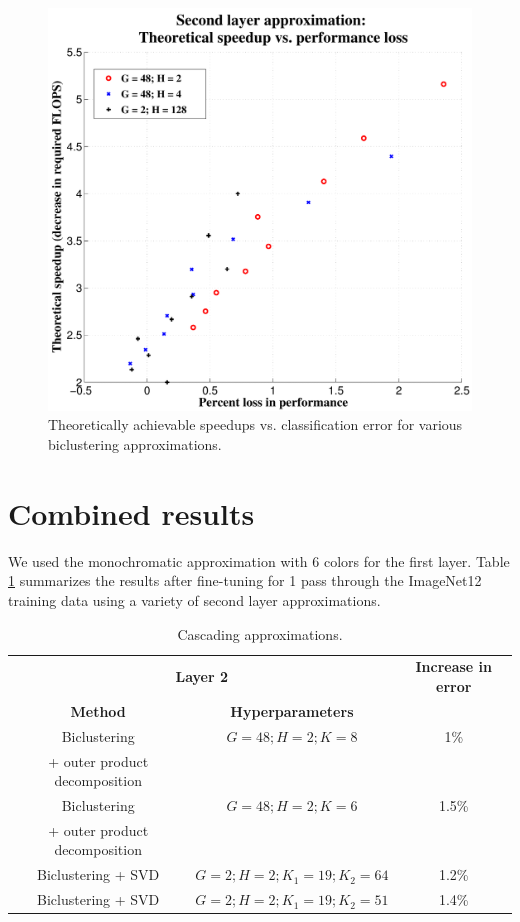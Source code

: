 \documentclass{article} %
\begin{document}
\begin{figure}[t]
\centering
\begin{minipage}{0.75\textwidth}
  \includegraphics[width=\linewidth]{img/layer2_theoreticalspeedup_vs_performance_loss.pdf} 
\end{minipage}
\caption{Theoretically achievable speedups vs. classification error for various biclustering approximations.}
\label{fig:biclustering_theory}
\end{figure}

\section{Combined results}
We used the monochromatic approximation with 6 colors for the first layer. Table \ref{table:combined} summarizes the results after fine-tuning for 1 pass through the ImageNet12 training data using a variety of second layer approximations.

\begin{table}[b]
\centering
\begin{tabular}{|cc|c|}
\hline
\multicolumn{2}{|c|}{{\bf Layer 2 }} & {\bf Increase in error}\\ 
{\bf Method} & {\bf Hyperparameters}& \\  
\hline
\hline
Biclustering & $G = 48; H = 2; K = 8$ & 1\%\\
 + outer product decomposition & & \\ 
\hline
Biclustering & $G = 48; H = 2; K = 6$ & 1.5\%\\
 + outer product decomposition & & \\ 
\hline
Biclustering + SVD & $G = 2; H = 2; K_1 = 19; K_2 = 64$ & 1.2\%\\
\hline
Biclustering + SVD & $G = 2; H = 2; K_1 = 19; K_2 = 51$ & 1.4\%\\
\hline
\end{tabular}
\caption{Cascading approximations.} 
\label{table:combined}
\end{table}
\end{document}
